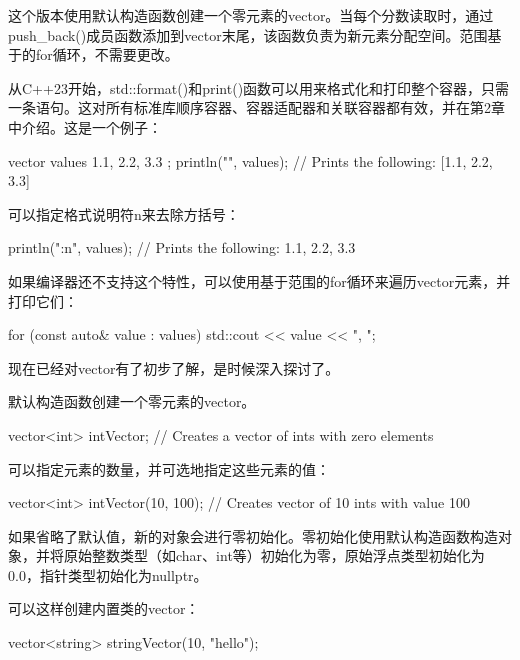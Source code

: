 这个版本使用默认构造函数创建一个零元素的vector。当每个分数读取时，通过push\_back()成员函数添加到vector末尾，该函数负责为新元素分配空间。范围基于的for循环，不需要更改。



从C++23开始，std::format()和print()函数可以用来格式化和打印整个容器，只需一条语句。这对所有标准库顺序容器、容器适配器和关联容器都有效，并在第2章中介绍。这是一个例子：

\begin{cpp}
vector values { 1.1, 2.2, 3.3 };
println("{}", values); // Prints the following: [1.1, 2.2, 3.3]
\end{cpp}

可以指定格式说明符n来去除方括号：

\begin{cpp}
println("{:n}", values); // Prints the following: 1.1, 2.2, 3.3
\end{cpp}

如果编译器还不支持这个特性，可以使用基于范围的for循环来遍历vector元素，并打印它们：

\begin{cpp}
for (const auto& value : values) { std::cout << value << ", "; }
\end{cpp}



现在已经对vector有了初步了解，是时候深入探讨了。


默认构造函数创建一个零元素的vector。

\begin{cpp}
vector<int> intVector; // Creates a vector of ints with zero elements
\end{cpp}

可以指定元素的数量，并可选地指定这些元素的值：

\begin{cpp}
vector<int> intVector(10, 100); // Creates vector of 10 ints with value 100
\end{cpp}

如果省略了默认值，新的对象会进行零初始化。零初始化使用默认构造函数构造对象，并将原始整数类型（如char、int等）初始化为零，原始浮点类型初始化为0.0，指针类型初始化为nullptr。

可以这样创建内置类的vector：

\begin{cpp}
vector<string> stringVector(10, "hello");
\end{cpp}

